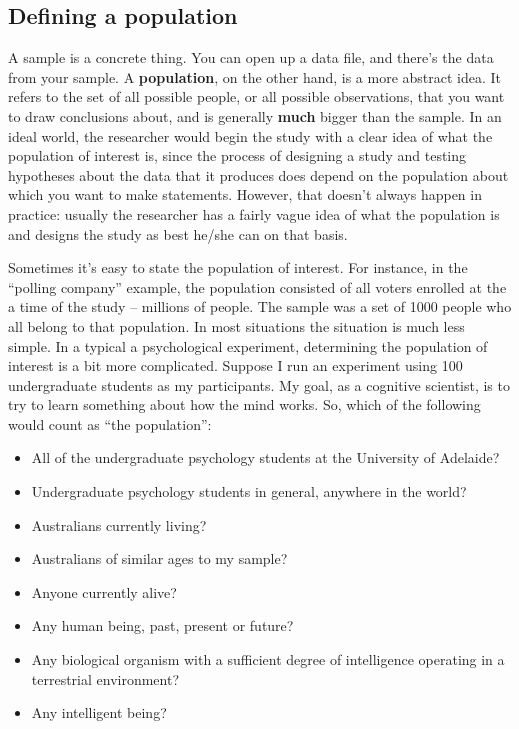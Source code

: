 \documentclass[
]{book}
\begin{document}
\subsection{Defining a population}\label{defining-a-population}

A sample is a concrete thing. You can open up a data file, and there's the data from your sample. A \textbf{population}, on the other hand, is a more abstract idea. It refers to the set of all possible people, or all possible observations, that you want to draw conclusions about, and is generally \textbf{much} bigger than the sample. In an ideal world, the researcher would begin the study with a clear idea of what the population of interest is, since the process of designing a study and testing hypotheses about the data that it produces does depend on the population about which you want to make statements. However, that doesn't always happen in practice: usually the researcher has a fairly vague idea of what the population is and designs the study as best he/she can on that basis.

Sometimes it's easy to state the population of interest. For instance, in the ``polling company'' example, the population consisted of all voters enrolled at the a time of the study -- millions of people. The sample was a set of 1000 people who all belong to that population. In most situations the situation is much less simple. In a typical a psychological experiment, determining the population of interest is a bit more complicated. Suppose I run an experiment using 100 undergraduate students as my participants. My goal, as a cognitive scientist, is to try to learn something about how the mind works. So, which of the following would count as ``the population'':

\begin{itemize}
\item
  All of the undergraduate psychology students at the University of Adelaide?
\item
  Undergraduate psychology students in general, anywhere in the world?
\item
  Australians currently living?
\item
  Australians of similar ages to my sample?
\item
  Anyone currently alive?
\item
  Any human being, past, present or future?
\item
  Any biological organism with a sufficient degree of intelligence operating in a terrestrial environment?
\item
  Any intelligent being?
\end{itemize}
\end{document}
